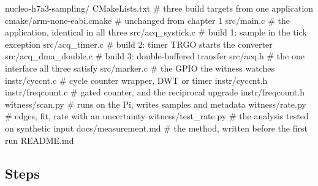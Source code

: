 \begin{plaincode}
nucleo-h7a3-sampling/
  CMakeLists.txt                  # three build targets from one application
  cmake/arm-none-eabi.cmake       # unchanged from chapter 1
  src/main.c                      # the application, identical in all three
  src/acq_systick.c               # build 1: sample in the tick exception
  src/acq_timer.c                 # build 2: timer TRGO starts the converter
  src/acq_dma_double.c            # build 3: double-buffered transfer
  src/acq.h                       # the one interface all three satisfy
  src/marker.c                    # the GPIO the witness watches
  instr/cyccnt.c                  # cycle counter wrapper, DWT or timer
  instr/cyccnt.h
  instr/freqcount.c               # gated counter, and the reciprocal upgrade
  instr/freqcount.h
  witness/scan.py                 # runs on the Pi, writes samples and metadata
  witness/rate.py                 # edges, fit, rate with an uncertainty
  witness/test_rate.py            # the analysis tested on synthetic input
  docs/measurement.md             # the method, written before the first run
  README.md
\end{plaincode}

\subsection*{Steps}

